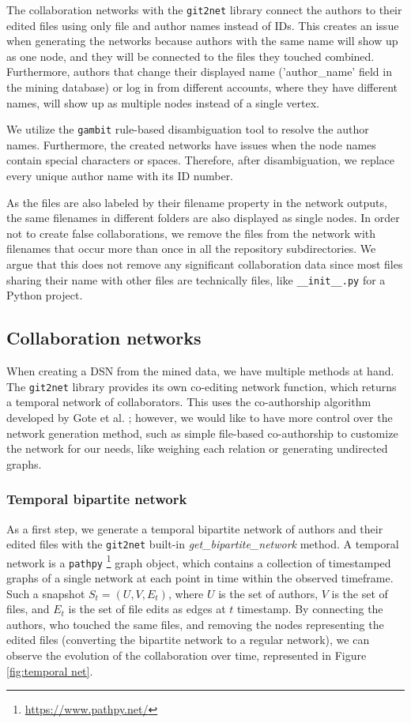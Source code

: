 The collaboration networks with the \texttt{git2net} library connect the authors to their edited files using only file and author names instead of IDs. This creates an issue when generating the networks because authors with the same name will show up as one node, and they will be connected to the files they touched combined. Furthermore, authors that change their displayed name ('author\_name' field in the mining database) or log in from different accounts, where they have different names, will show up as multiple nodes instead of a single vertex.

We utilize the \texttt{gambit} \cite{goteGambitOpenSource2021} rule-based disambiguation tool to resolve the author names. Furthermore, the created networks have issues when the node names contain special characters or spaces. Therefore, after disambiguation, we replace every unique author name with its ID number.

As the files are also labeled by their filename property in the network outputs, the same filenames in different folders are also displayed as single nodes. In order not to create false collaborations, we remove the files from the network with filenames that occur more than once in all the repository subdirectories. We argue that this does not remove any significant collaboration data since most files sharing their name with other files are technically files, like \texttt{\_\_init\_\_.py} for a Python project.

\subsection{Collaboration networks}

When creating a DSN from the mined data, we have multiple methods at hand. The \texttt{git2net} library provides its own co-editing network function, which returns a temporal network of collaborators. This uses the co-authorship algorithm developed by Gote et al. \cite{goteAnalysingTimeStampedCoEditing2019}; however, we would like to have more control over the network generation method, such as simple file-based co-authorship to customize the network for our needs, like weighing each relation or generating undirected graphs.

\subsubsection{Temporal bipartite network}
As a first step, we generate a temporal bipartite network of authors and their edited files with the \texttt{git2net} built-in \textit{get\_bipartite\_network} method. A temporal network is a \texttt{pathpy} \footnote{\url{https://www.pathpy.net/}} graph object, which contains a collection of timestamped graphs of a single network at each point in time within the observed timeframe. Such a snapshot $S_t = (U, V, E_t)$, where $U$ is the set of authors, $V$ is the set of files, and $E_t$ is the set of file edits as edges at $t$ timestamp. By connecting the authors, who touched the same files, and removing the nodes representing the edited files (converting the bipartite network to a regular network), we can observe the evolution of the collaboration over time, represented in Figure \ref{fig:temporal net}.

